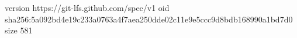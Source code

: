 version https://git-lfs.github.com/spec/v1
oid sha256:5a092bd4e19c233a0763a4f7aea250dde02c11e9e5ccc9d8bdb168990a1bd7d0
size 581
